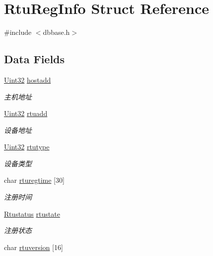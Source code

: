 \hypertarget{structRtuRegInfo}{\section{Rtu\-Reg\-Info Struct Reference}
\label{structRtuRegInfo}
}


{\ttfamily \#include $<$dbbase.\-h$>$}

\subsection*{Data Fields}
\begin{DoxyCompactItemize}
\item 
\hyperlink{base_8h_a60cf7b3c038ce37a50796e8eaddf0b5f}{Uint32} \hyperlink{structRtuRegInfo_a3a9169b06ae6cdef4716b9ce96e2effb}{hostadd}
\begin{DoxyCompactList}\small\item\em 主机地址 \end{DoxyCompactList}\item 
\hyperlink{base_8h_a60cf7b3c038ce37a50796e8eaddf0b5f}{Uint32} \hyperlink{structRtuRegInfo_a11bec18706037da6d0d8893a3f6ecc8c}{rtuadd}
\begin{DoxyCompactList}\small\item\em 设备地址 \end{DoxyCompactList}\item 
\hyperlink{base_8h_a60cf7b3c038ce37a50796e8eaddf0b5f}{Uint32} \hyperlink{structRtuRegInfo_ac8d17922e46094960fb8c88d9ad370c5}{rtutype}
\begin{DoxyCompactList}\small\item\em 设备类型 \end{DoxyCompactList}\item 
char \hyperlink{structRtuRegInfo_a1f2c3c801990368f9dad237d7d7be01c}{rturegtime} \mbox{[}30\mbox{]}
\begin{DoxyCompactList}\small\item\em 注册时间 \end{DoxyCompactList}\item 
\hyperlink{dbbase_8h_afec5109c9a49125c493619b015292bb0}{Rtustatus} \hyperlink{structRtuRegInfo_af41795f7f1ce079734677e5e6fa77573}{rtustate}
\begin{DoxyCompactList}\small\item\em 注册状态 \end{DoxyCompactList}\item 
char \hyperlink{structRtuRegInfo_a3e6ef94328a1a1f1246bf7a7f91b4e2b}{rtuversion} \mbox{[}16\mbox{]}

\end{DoxyCompactItemize}
